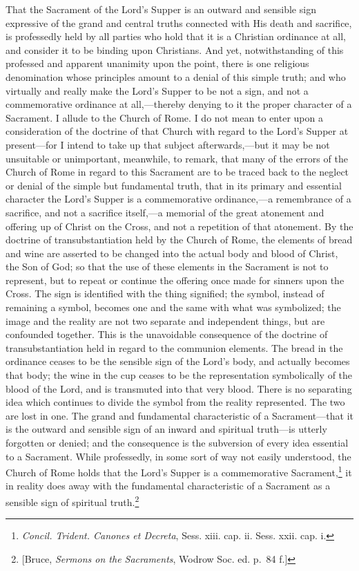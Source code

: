 \documentclass[english,]{book}
\begin{document}
That the Sacrament of the Lord's Supper is an outward and sensible sign expressive of the grand and central truths connected with His death and sacrifice, is professedly held by all parties who hold that it is a Christian ordinance at all, and consider it to be binding upon Christians. And yet, notwithstanding of this professed and apparent unanimity upon the point, there is one religious denomination whose principles amount to a denial of this simple truth; and who virtually and really make the Lord's Supper to be not a sign, and not a commemorative ordinance at all,---thereby denying to it the proper character of a Sacrament. I allude to the Church of Rome. I do not mean to enter upon a consideration of the doctrine of that Church with regard to the Lord's Supper at present---for I intend to take up that subject afterwards,---but it may be not unsuitable or unimportant, meanwhile, to remark, that many of the errors of the Church of Rome in regard to this Sacrament are to be traced back to the neglect or denial of the simple but fundamental truth, that in its primary and essential character the Lord's Supper is a commemorative ordinance,---a remembrance of a sacrifice, and not a sacrifice itself,---a memorial of the great atonement and offering up of Christ on the Cross, and not a repetition of that atonement. By the doctrine of transubstantiation held by the Church of Rome, the elements of bread and wine are asserted to be changed into the actual body and blood of Christ, the Son of God; so that the use of these elements in the Sacrament is not to represent, but to repeat or continue the offering once made for sinners upon the Cross. The sign is identified with the thing signified; the symbol, instead of remaining a symbol, becomes one and the same with what was symbolized; the image and the reality are not two separate and independent things, but are confounded together. This is the unavoidable consequence of the doctrine of transubstantiation held in regard to the communion elements. The bread in the ordinance ceases to be the sensible sign of the Lord's body, and actually becomes that body; the wine in the cup ceases to be the representation symbolically of the blood of the Lord, and is transmuted into that very blood. There is no separating idea which continues to divide the symbol from the reality represented. The two are lost in one. The grand and fundamental characteristic of a Sacrament---that it is the outward and sensible sign of an inward and spiritual truth---is utterly forgotten or denied; and the consequence is the subversion of every idea essential to a Sacrament. While professedly, in some sort of way not easily understood, the Church of Rome holds that the Lord's Supper is a commemorative Sacrament,\footnote{\emph{Concil. Trident. Canones et Decreta}, Sess. xiii. cap. ii. Sess. xxii. cap. i.} it in reality does away with the fundamental characteristic of a Sacrament as a sensible sign of spiritual truth.\footnote{{[}Bruce, \emph{Sermons on the Sacraments}, Wodrow Soc. ed. p.~84 f.{]}}
\end{document}
